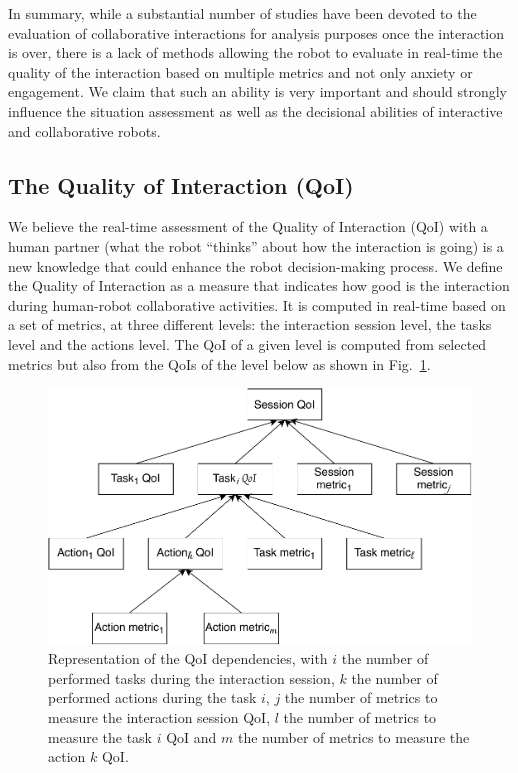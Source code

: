 \documentclass[a4paper,11pt,twoside]{StyleThese}
\begin{document}
In summary, while a substantial number of studies have been devoted to the evaluation of collaborative interactions for analysis purposes once the interaction is over, there is a lack of methods allowing the robot to evaluate in real-time the quality of the interaction based on multiple metrics and not only anxiety or engagement. We claim that such an ability is very important and should strongly influence the situation assessment as well as the decisional abilities of interactive and collaborative robots. 




\subsection{The Quality of Interaction (QoI)}\label{sec:eval}

We believe the real-time assessment of the Quality of Interaction (QoI) with a human partner (\ie what the robot ``thinks'' about how the interaction is going) is a new knowledge that could enhance the robot decision-making process. We define the Quality of Interaction as a measure that indicates how good is the interaction during human-robot collaborative activities. It is computed in real-time based on a set of metrics, at three different levels: the interaction session level, the tasks level and the actions level. The QoI of a given level is computed from selected metrics but also from the QoIs of the level below as shown in Fig.~\ref{fig:qoi_schema}.

\begin{figure}[!ht]
	\centering
	\includegraphics[width=\linewidth]{figures/chapter2/QoI_schema.pdf}
	\caption{Representation of the QoI dependencies, with $i$ the number of performed tasks during the interaction session, $k$ the number of performed actions during the task $i$, $j$ the number of metrics to measure the interaction session QoI, $l$ the number of metrics to measure the task $i$ QoI and $m$ the number of metrics to measure the action $k$ QoI.}
	\label{fig:qoi_schema}
\end{figure}
\end{document}
